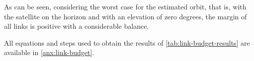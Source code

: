 
As can be seen, considering the worst case for the estimated orbit, that is, with the satellite on the horizon and with an elevation of zero degrees, the margin of all links is positive with a considerable balance.

All equations and steps used to obtain the results of \autoref{tab:link-budget-results} are available in \autoref{anx:link-budget}.
